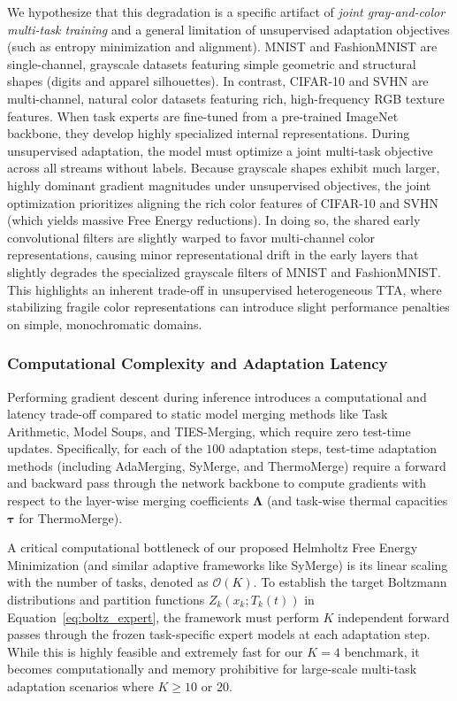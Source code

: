 We hypothesize that this degradation is a specific artifact of \emph{joint gray-and-color multi-task training} and a general limitation of unsupervised adaptation objectives (such as entropy minimization and alignment). MNIST and FashionMNIST are single-channel, grayscale datasets featuring simple geometric and structural shapes (digits and apparel silhouettes). In contrast, CIFAR-10 and SVHN are multi-channel, natural color datasets featuring rich, high-frequency RGB texture features. When task experts are fine-tuned from a pre-trained ImageNet backbone, they develop highly specialized internal representations. During unsupervised adaptation, the model must optimize a joint multi-task objective across all streams without labels. Because grayscale shapes exhibit much larger, highly dominant gradient magnitudes under unsupervised objectives, the joint optimization prioritizes aligning the rich color features of CIFAR-10 and SVHN (which yields massive Free Energy reductions). In doing so, the shared early convolutional filters are slightly warped to favor multi-channel color representations, causing minor representational drift in the early layers that slightly degrades the specialized grayscale filters of MNIST and FashionMNIST. This highlights an inherent trade-off in unsupervised heterogeneous TTA, where stabilizing fragile color representations can introduce slight performance penalties on simple, monochromatic domains.

\subsubsection{Computational Complexity and Adaptation Latency}
Performing gradient descent during inference introduces a computational and latency trade-off compared to static model merging methods like Task Arithmetic, Model Soups, and TIES-Merging, which require zero test-time updates. Specifically, for each of the $100$ adaptation steps, test-time adaptation methods (including AdaMerging, SyMerge, and ThermoMerge) require a forward and backward pass through the network backbone to compute gradients with respect to the layer-wise merging coefficients $\boldsymbol{\Lambda}$ (and task-wise thermal capacities $\boldsymbol{\tau}$ for ThermoMerge).

A critical computational bottleneck of our proposed Helmholtz Free Energy Minimization (and similar adaptive frameworks like SyMerge) is its linear scaling with the number of tasks, denoted as $\mathcal{O}(K)$. To establish the target Boltzmann distributions and partition functions $Z_k(x_k; T_k(t))$ in Equation~\eqref{eq:boltz_expert}, the framework must perform $K$ independent forward passes through the frozen task-specific expert models at each adaptation step. While this is highly feasible and extremely fast for our $K=4$ benchmark, it becomes computationally and memory prohibitive for large-scale multi-task adaptation scenarios where $K \ge 10$ or $20$. 

